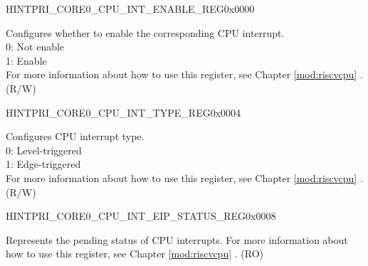 \begin{register}{H}{INTPRI\_CORE0\_CPU\_INT\_ENABLE\_REG}{0x0000}\label{regdesc:INTPRICORE0CPUINTENABLEREG}
%
\regnewline%
\begin{regdesc}\begin{reglist}
\label{fielddesc:INTPRICORE0CPUINTENABLE}\item [INTPRI\_CORE0\_CPU\_INT\_ENABLE] Configures whether to enable the corresponding CPU interrupt. \\
0: Not enable\\
1: Enable\\
For more information about how to use this register, see Chapter \ref{mod:riscvcpu} \textit{}.\\
(R/W)
\end{reglist}\end{regdesc}
\end{register}


\begin{register}{H}{INTPRI\_CORE0\_CPU\_INT\_TYPE\_REG}{0x0004}\label{regdesc:INTPRICORE0CPUINTTYPEREG}
%
\regnewline%
\begin{regdesc}\begin{reglist}
\label{fielddesc:INTPRICORE0CPUINTTYPE}\item [INTPRI\_CORE0\_CPU\_INT\_TYPE] Configures CPU interrupt type. \\
0: Level-triggered\\
1: Edge-triggered\\
For more information about how to use this register, see Chapter \ref{mod:riscvcpu} \textit{}.\\
(R/W)
\end{reglist}\end{regdesc}
\end{register}


\begin{register}{H}{INTPRI\_CORE0\_CPU\_INT\_EIP\_STATUS\_REG}{0x0008}\label{regdesc:INTPRICORE0CPUINTEIPSTATUSREG}
%
\regnewline%
\begin{regdesc}\begin{reglist}
\label{fielddesc:INTPRICORE0CPUINTEIPSTATUS}\item [INTPRI\_CORE0\_CPU\_INT\_EIP\_STATUS] Represents the pending status of CPU interrupts. For more information about how to use this register, see Chapter \ref{mod:riscvcpu} \textit{}. (RO)
\end{reglist}\end{regdesc}
\end{register}


